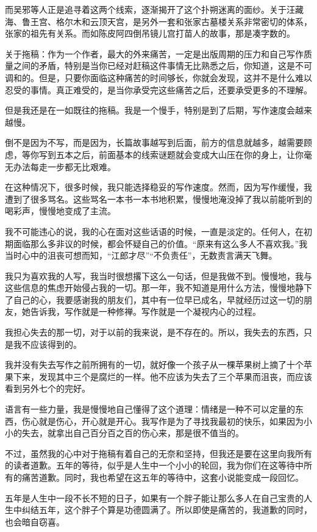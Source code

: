 而吴邪等人正是追寻着这两个线索，逐渐揭开了这个扑朔迷离的面纱。关于汪藏海、鲁王宫、格尔木和云顶天宫，是另外一套和张家古墓楼关系非常密切的体系，张家的祖先有关系。而如陈皮阿四倒吊镜儿宫打苗人的故事，那是凑字数的。

关于拖稿：作为一个作者，最大的外来痛苦，一定是出版周期的压力和自己写作质量之间的矛盾，特别是当你已经对赶稿这件事情无比熟悉之后，你知道，这是不可调和的。但是，只要你面临这种痛苦的时间够长，你就会发现，这并不是什么难以忍受的事情。真正难受的，是当你承受完这些痛苦之后，还要承受更多的不理解。

但是我还是在一如既往的拖稿。我是一个慢手，特别是到了后期，写作速度会越来越慢。

倒不是因为不写，而是因为，长篇故事越写到后面，前方的信息就越多，越需要顾虑，等你写到五本之后，前面基本的线索谜题就会变成大山压在你的身上，让你毫无办法每走一步都无比艰难。

在这种情况下，很多时候，我只能选择稳妥的写作速度。然而，因为写作缓慢，我遭到了很多骂名。这些骂名一本书一本书地积累，慢慢地淹没掉了我以前能听到的喝彩声，慢慢地变成了主流。

我不可能违心的说，我的心在面对这些话语的时候，一直是淡定的。任何人，在初期面临那么多非议的时候，都会怀疑自己的价值。“原来有这么多人不喜欢我。”我当时心中的沮丧可想而知，“江郎才尽”“不负责任”，无数责言满天飞舞。

我只为喜欢我的人写，我当时很想撂下这么一句话，但是我做不到。慢慢地，我与这些信息的焦虑开始侵占我的一切。那一年，我不知道是用什么方法，慢慢地静下了自己的心，我要感谢我的朋友们，其中有一位早已成名，早就经历过这一切的朋友，她告诉我，写作就是一种修禅。写作就是一个凝视内心的过程。

我担心失去的那一切，对于以前的我来说，是不存在的。所以，我失去的东西，只是我不应该得到的。

我并没有失去写作之前所拥有的一切，就好像一个孩子从一棵苹果树上摘了十个苹果下来，发现其中三个是腐烂的一样。他不应该为失去了三个苹果而沮丧，而应该看到另外七个的完好。

语言有一些力量，我是慢慢地自己懂得了这个道理：情绪是一种不可以定量的东西，伤心就是伤心，开心就是开心。我写作是为了寻找我最初的快乐，如果因为小小的失去，就拿出自己百分百之百的伤心来，那是很不值当的。

不过，虽然我的心中对于拖稿有着自己的无奈和坚持，但我还是要在这里向我所有的读者道歉。五年的等待，似乎是人生中一个小小的轮回，我为你们在这等待中所有的痛苦道歉。同时，我也希望在这五年的等待中，这套小说能变成一段回忆。

五年是人生中一段不长不短的日子，如果有一个胖子能让那么多人在自己宝贵的人生中纠结五年，这个胖子个算是功德圆满了。所以即使是痛苦的，我道歉的同时，也会暗自窃喜。

